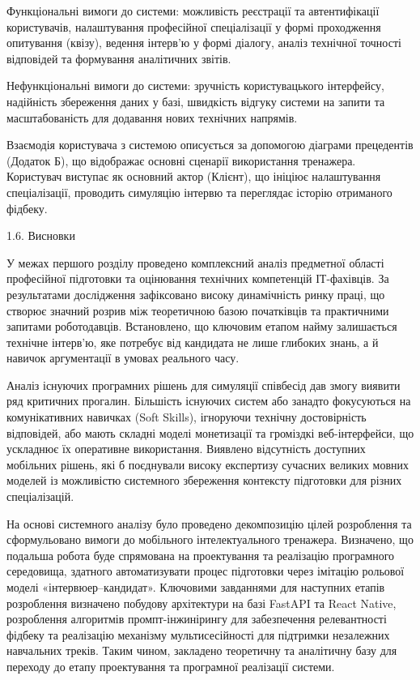 \documentclass[
]{article}
\begin{document}
Функціональні вимоги до системи: можливість реєстрації та автентифікації
користувачів, налаштування професійної спеціалізації у формі проходження
опитування (квізу), ведення інтерв'ю у формі діалогу, аналіз технічної
точності відповідей та формування аналітичних звітів.

Нефункціональні вимоги до системи: зручність користувацького інтерфейсу,
надійність збереження даних у базі, швидкість відгуку системи на запити
та масштабованість для додавання нових технічних напрямів.

Взаємодія користувача з системою описується за допомогою діаграми
прецедентів (Додаток Б), що відображає основні сценарії використання
тренажера. Користувач виступає як основний актор (Клієнт), що ініціює
налаштування спеціалізації, проводить симуляцію інтерв\textquotesingle ю
та переглядає історію отриманого фідбеку.

\protect{}\label{_Toc228981057}{}1.6. Висновки

У межах першого розділу проведено комплексний аналіз предметної області
професійної підготовки та оцінювання технічних компетенцій ІТ-фахівців.
За результатами дослідження зафіксовано високу динамічність ринку праці,
що створює значний розрив між теоретичною базою початківців та
практичними запитами роботодавців. Встановлено, що ключовим етапом найму
залишається технічне інтерв'ю, яке потребує від кандидата не лише
глибоких знань, а й навичок аргументації в умовах реального часу.

Аналіз існуючих програмних рішень для симуляції співбесід дав змогу
виявити ряд критичних прогалин. Більшість існуючих систем або занадто
фокусуються на комунікативних навичках (Soft Skills), ігноруючи технічну
достовірність відповідей, або мають складні моделі монетизації та
громіздкі веб-інтерфейси, що ускладнює їх оперативне використання.
Виявлено відсутність доступних мобільних рішень, які б поєднували високу
експертизу сучасних великих мовних моделей із можливістю системного
збереження контексту підготовки для різних спеціалізацій.

На основі системного аналізу було проведено декомпозицію цілей
розроблення та сформульовано вимоги до мобільного інтелектуального
тренажера. Визначено, що подальша робота буде спрямована на проектування
та реалізацію програмного середовища, здатного автоматизувати процес
підготовки через імітацію рольової моделі
«інтерв\textquotesingle юер--кандидат». Ключовими завданнями для
наступних етапів розроблення визначено побудову архітектури на базі
FastAPI та React Native, розроблення алгоритмів промпт-інжинірингу для
забезпечення релевантності фідбеку та реалізацію механізму
мультисесійності для підтримки незалежних навчальних треків. Таким
чином, закладено теоретичну та аналітичну базу для переходу до етапу
проектування та програмної реалізації системи.
\end{document}
